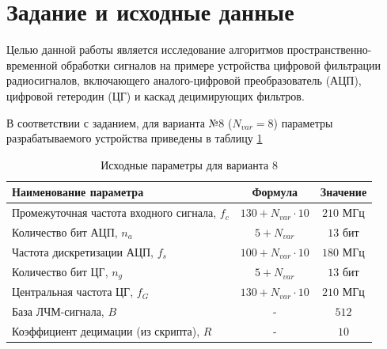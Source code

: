 \section{Задание и исходные данные}

Целью данной работы является исследование алгоритмов пространственно-временной обработки сигналов на примере устройства цифровой фильтрации радиосигналов, включающего аналого-цифровой преобразователь (АЦП), цифровой гетеродин (ЦГ) и каскад децимирующих фильтров.

В соответствии с заданием, для варианта №8 ($N_{var} = 8$) параметры разрабатываемого устройства приведены в таблицу \ref{tab:params}
\begin{table}[H]
    \centering
    \caption{Исходные параметры для варианта 8}
    \label{tab:params}
    \vspace{2mm}
    \begin{tabular}{|l|c|c|}
        \hline
        \textbf{Наименование параметра} & \textbf{Формула} & \textbf{Значение} \\ \hline
        Промежуточная частота входного сигнала, $f_c$ & $130 + N_{var} \cdot 10$ & $210$ МГц \\ \hline
        Количество бит АЦП, $n_a$ & $5 + N_{var}$ & $13$ бит \\ \hline
        Частота дискретизации АЦП, $f_s$ & $100 + N_{var} \cdot 10$ & $180$ МГц \\ \hline
        Количество бит ЦГ, $n_g$ & $5 + N_{var}$ & $13$ бит \\ \hline
        Центральная частота ЦГ, $f_G$ & $130 + N_{var} \cdot 10$ & $210$ МГц \\ \hline
        База ЛЧМ-сигнала, $B$ & - & $512$ \\ \hline
        Коэффициент децимации (из скрипта), $R$ & - & $10$ \\ \hline
    \end{tabular}
\end{table}

